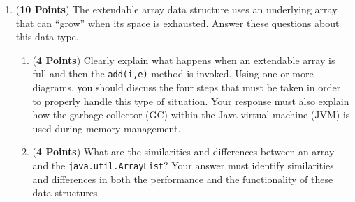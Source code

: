 \documentclass[12pt]{article}
\begin{document}
\begin{enumerate}

 \item ({\bf 10 Points}) The extendable array data structure uses an
  underlying array that can ``grow'' when its space is exhausted.
  Answer these questions about this data type.

  \begin{enumerate}

  \item ({\bf 4 Points}) Clearly explain what happens when an
    extendable array is full and then the {\tt add(i,e)} method is
    invoked. Using one or more diagrams, you should discuss the four
    steps that must be taken in order to properly handle this type of
    situation.  Your response must also explain how the garbage
    collector (GC) within the Java virtual machine (JVM) is used
    during memory management.


  \item ({\bf 4 Points}) What are the similarities and differences
    between an array and the {\tt java.util.ArrayList}?  Your answer
    must identify similarities and differences in both the performance
    and the functionality of these data structures.




\end{enumerate}
\end{enumerate}
\end{document}
